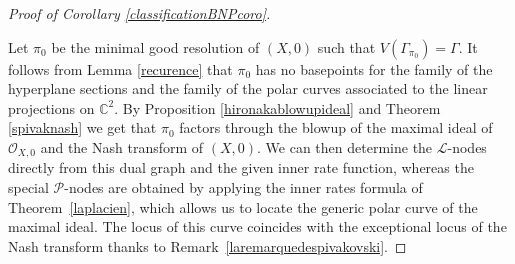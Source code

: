 \documentclass[reqno,dvipsnames,12pt]{amsart}
\begin{document}
\begin{proof}[Proof of Corollary \ref{classificationBNPcoro}]
\begin{enumerate}
	  \end{enumerate}	  
 
	  Let $\pi_0$ be the minimal good resolution of $(X,0)$ such that $V(\Gamma_{\pi_0})=\Gamma$. It follows from Lemma \ref{recurence} that $\pi_{0}$ has no basepoints for the family of the hyperplane sections and the family  of the polar curves associated to the linear projections on $\mathbb{C}^2$. By Proposition \ref{hironakablowupideal} and Theorem \ref{spivaknash} we get that $\pi_{0}$  factors through the blowup of the maximal ideal of $\mathcal{O}_{X,0}$ and the Nash transform of $(X,0)$. We can then determine the $\mathcal{L}$-nodes directly from this dual graph and the given inner rate function, whereas the special $\mathcal{P}$-nodes are obtained by applying the inner rates formula of Theorem~\ref{laplacien}, which allows us to locate the generic polar curve of the maximal ideal. The locus of this  curve coincides with the exceptional locus of the Nash transform thanks to Remark~\ref{laremarquedespivakovski}.
	  
	  
	  
	  
	  
	

	  
	  
	  
	  
	  
	  
	  
	  
	  \end{proof}
\end{document}
